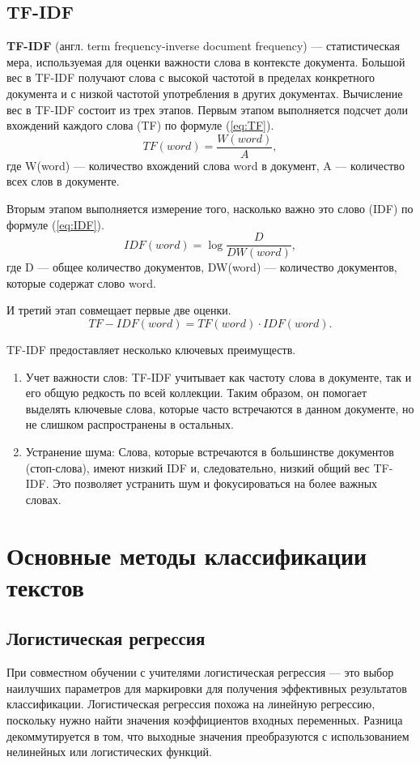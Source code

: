 \subsection{TF-IDF}
\textbf{TF-IDF} (англ. term frequency-inverse document frequency) --- статистическая мера, используемая для
оценки важности слова в контексте документа. Большой вес в TF-IDF получают слова с высокой частотой в пределах конкретного документа и с низкой частотой употребления в других документах. Вычисление вес в TF-IDF состоит из трех этапов. Первым этапом выполняется подсчет доли вхождений каждого слова (TF) по формуле (\ref{eq:TF}).
\begin{equation}\label{eq:TF}
	TF(word) = \frac{W(word)}{A},
\end{equation}
где W(word) --- количество вхождений слова word в документ, A --- количество всех слов в документе.

Вторым этапом выполняется измерение того, насколько важно это слово (IDF) по формуле (\ref{eq:IDF}).
\begin{equation}\label{eq:IDF}
    IDF(word) = \log\frac{D}{DW(word)} ,
\end{equation}
где D --- общее количество документов, DW(word) --- количество документов, которые содержат слово word.

И третий этап совмещает первые две оценки.
\begin{equation}\label{eq:TFIDF}
    TF-IDF(word) = TF(word) \cdot IDF(word).
\end{equation}

TF-IDF предоставляет несколько ключевых преимуществ.
\begin{enumerate}
    \item Учет важности слов: TF-IDF учитывает как частоту слова в документе, так и его общую редкость по всей коллекции. Таким образом, он помогает выделять ключевые слова, которые часто встречаются в данном документе, но не слишком распространены в остальных.
    \item Устранение шума: Слова, которые встречаются в большинстве документов (стоп-слова), имеют низкий IDF и, следовательно, низкий общий вес TF-IDF. Это позволяет устранить шум и фокусироваться на более важных словах.
\end{enumerate}

\section{Основные методы классификации текстов}
\subsection{Логистическая регрессия}
При совместном обучении с учителями логистическая регрессия --- это выбор наилучших параметров для маркировки для получения эффективных результатов классификации. Логистическая регрессия похожа на линейную регрессию, поскольку нужно найти значения коэффициентов входных переменных. Разница декоммутируется в том, что выходные значения преобразуются с использованием нелинейных или логистических функций.

